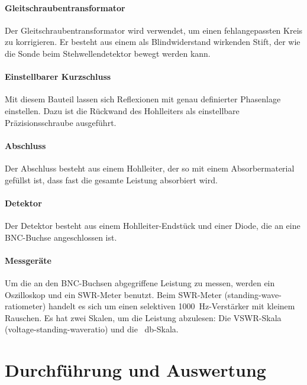 \documentclass[a4paper]{article}
\begin{document}
\paragraph{Gleitschraubentransformator}
Der Gleitschraubentransformator wird verwendet, um einen fehlangepassten Kreis zu korrigieren. Er besteht aus einem als Blindwiderstand wirkenden Stift, der wie die Sonde beim Stehwellendetektor bewegt werden kann.
\paragraph{Einstellbarer Kurzschluss} Mit diesem Bauteil lassen sich Reflexionen mit genau definierter Phasenlage einstellen. Dazu ist die Rückwand des Hohlleiters als einstellbare Präzisionsschraube ausgeführt.
\paragraph{Abschluss} Der Abschluss besteht aus einem Hohlleiter, der so mit einem Absorbermaterial gefüllst ist, dass fast die gesamte Leistung absorbiert wird.
\paragraph{Detektor} Der Detektor besteht aus einem Hohlleiter-Endstück und einer Diode, die an eine BNC-Buchse angeschlossen ist.
\paragraph{Messgeräte} Um die an den BNC-Buchsen abgegriffene Leistung zu messen, werden ein Oszilloskop und ein SWR-Meter benutzt. Beim SWR-Meter (standing-wave-ratiometer) handelt es sich um einen selektiven \SI{1000}{\hertz}-Verstärker mit kleinem Rauschen. Es hat zwei Skalen, um die Leistung abzulesen: Die VSWR-Skala (voltage-standing-waveratio) und die \SI{}{\decibel}-Skala.


\section{Durchführung und Auswertung}
\end{document}
